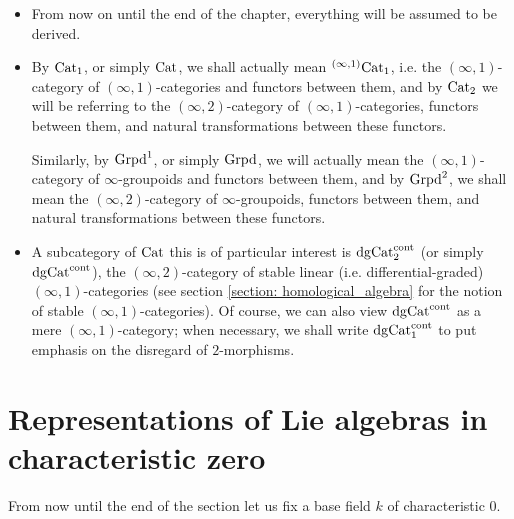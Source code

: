     \begin{convention} \label{conv: formal_geometry_everything_is_derived}
        \noindent
        \begin{itemize}
            \item From now on until the end of the chapter, everything will be assumed to be derived. 
            \item By $\mathrm{Cat}_1$, or simply $\mathrm{Cat}$, we shall actually mean ${}^{(\infty, 1)}\mathrm{Cat}_1$, i.e. the $(\infty, 1)$-category of $(\infty, 1)$-categories and functors between them, and by $\mathrm{Cat}_2$ we will be referring to the $(\infty, 2)$-category of $(\infty, 1)$-categories, functors between them, and natural transformations between these functors. 
            
            Similarly, by $\mathrm{Grpd}^1$, or simply $\mathrm{Grpd}$, we will actually mean the $(\infty, 1)$-category of $\infty$-groupoids and functors between them, and by $\mathrm{Grpd}^2$, we shall mean the $(\infty, 2)$-category of $\infty$-groupoids, functors between them, and natural transformations between these functors.
            \item A subcategory of $\mathrm{Cat}$ this is of particular interest is $\mathrm{dg}\mathrm{Cat}^{\mathrm{cont}}_2$ (or simply $\mathrm{dg}\mathrm{Cat}^{\mathrm{cont}}$), the $(\infty, 2)$-category of stable linear (i.e. differential-graded) $(\infty, 1)$-categories (see section \ref{section: homological_algebra} for the notion of stable $(\infty, 1)$-categories). Of course, we can also view $\mathrm{dg}\mathrm{Cat}^{\mathrm{cont}}$ as a mere $(\infty, 1)$-category; when necessary, we shall write $\mathrm{dg}\mathrm{Cat}^{\mathrm{cont}}_1$ to put emphasis on the disregard of $2$-morphisms.
        \end{itemize} 
    \end{convention}
    
    \section{Representations of Lie algebras in characteristic zero}
        \begin{convention}
            From now until the end of the section let us fix a base field $k$ of characteristic $0$.
        \end{convention}
    
